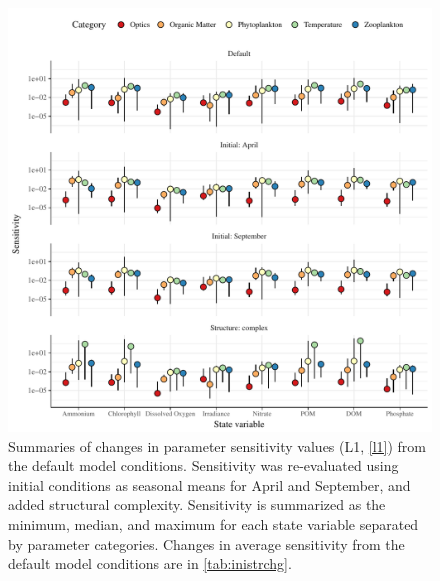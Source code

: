 \documentclass[letterpaper,12pt,oneside]{article}\usepackage[]{graphicx}\usepackage[]{color}
\newcommand{\beginsupplement}{%
        \setcounter{table}{0}
        \renewcommand{\thetable}{S\arabic{table}}%
        \setcounter{figure}{0}
        \renewcommand{\thefigure}{S\arabic{figure}}%
     }
\begin{document}
\begin{figure}[!ht]

{\centering \includegraphics[width=\textwidth]{figs/inistrsumm-1} 

}

\caption{Summaries of changes in parameter sensitivity values (L1, \cref{l1}) from the default model conditions.  Sensitivity was re-evaluated using initial conditions as seasonal means for April and September, and added structural complexity.  Sensitivity is summarized as the minimum, median, and maximum for each state variable separated by parameter categories. Changes in average sensitivity from the default model conditions are in \cref{tab:inistrchg}.}\label{fig:inistrsumm}
\end{figure}



\clearpage

\beginsupplement

\end{document}
